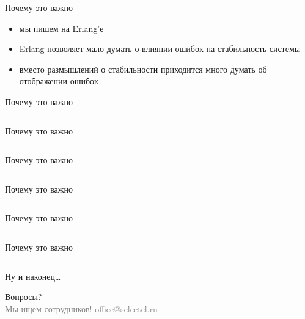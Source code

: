 \documentclass[10pt]{beamer}
\newcommand{\light}[1]{\textcolor{gray}{\footnotesize{#1}}}
\begin{document}
\begin{frame}{Почему это важно}
  \begin{itemize}
  \item мы пишем на Erlang'е
  \item Erlang позволяет мало думать о влиянии ошибок на стабильность системы
  \item вместо размышлений о стабильности приходится много думать об отображении ошибок
  \end{itemize}
\end{frame}

\begin{frame}{Почему это важно}
  \inputminted[linenos, frame=none, firstline=29, fontsize=\tiny, lastline=48,
  framesep=10pt, bgcolor=lightgray]{erlang}{code.erl}
\end{frame}

\begin{frame}{Почему это важно}
  \inputminted[linenos, frame=none, fontsize=\footnotesize,
  firstline=50, lastline=65, framesep=10pt, firstnumber=4,
  bgcolor=lightgray]{erlang}{code.erl}
\end{frame}

\begin{frame}{Почему это важно}
  \inputminted[linenos, frame=none, fontsize=\small,
  firstline=67, lastline=72, framesep=10pt,
  bgcolor=lightgray]{erlang}{code.erl}
\end{frame}

\begin{frame}{Почему это важно}
  \inputminted[linenos, frame=none, fontsize=\small,
  firstline=74, lastline=76, framesep=10pt, firstnumber=5,
  bgcolor=lightgray]{erlang}{code.erl}
\end{frame}

\begin{frame}{Почему это важно}
  \inputminted[linenos, frame=none, fontsize=\small,
  firstline=78, lastline=81, framesep=10pt, firstnumber=8,
  bgcolor=lightgray]{erlang}{code.erl}
\end{frame}

\begin{frame}{Почему это важно}
  \inputminted[linenos, frame=none, fontsize=\small,
  firstline=83, lastline=85, framesep=10pt, firstnumber=12,
  bgcolor=lightgray]{erlang}{code.erl}
\end{frame}

\begin{frame}{Ну и наконец…}
  \begin{center}
    \huge Вопросы?\\
    \light{Мы ищем сотрудников! office@selectel.ru}
  \end{center}
\end{frame}
\end{document}
